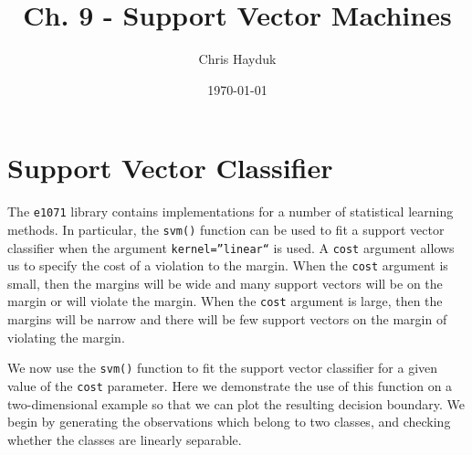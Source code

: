\documentclass[12pt]{article}\usepackage[]{graphicx}\usepackage[]{color}
\begin{document}
\title{Ch. 9 - Support Vector Machines}

\author{Chris Hayduk}
\date{\today}

\maketitle



\section{Support Vector Classifier}

The \texttt{e1071} library contains implementations for a number of statistical learning methods. In particular, the \texttt{svm()} function can be used to fit a support vector classifier when the argument \texttt{kernel=''linear``} is used. A \texttt{cost} argument allows us to specify the cost of a violation to the margin. When the \texttt{cost} argument is small, then the margins will be wide and many support vectors will be on the margin or will violate the margin. When the \texttt{cost} argument is large, then the margins will be narrow and there will be few support vectors on the margin of violating the margin.

We now use the \texttt{svm()} function to fit the support vector classifier for a given value of the \texttt{cost} parameter. Here we demonstrate the use of this function on a two-dimensional example so that we can plot the resulting decision boundary. We begin by generating the observations which belong to two classes, and checking whether the classes are linearly separable.
\end{document}
